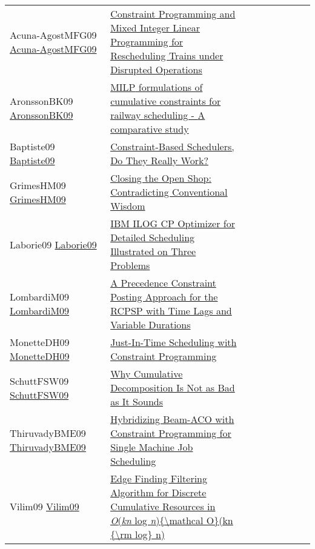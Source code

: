 {\begin{longtable}{p{3cm}p{7cm}lllllll}
Acuna-AgostMFG09 \href{https://doi.org/10.1007/978-3-642-01929-6\_24}{Acuna-AgostMFG09} &  \href{papers/Acuna-AgostMFG09.pdf}{Constraint Programming and Mixed Integer Linear Programming for Rescheduling Trains under Disrupted Operations} &  &  &  &  &  &  & \\
AronssonBK09 \href{http://drops.dagstuhl.de/opus/volltexte/2009/2141}{AronssonBK09} &  \href{papers/AronssonBK09.pdf}{{MILP} formulations of cumulative constraints for railway scheduling - {A} comparative study} &  &  &  &  &  &  & \\
Baptiste09 \href{https://doi.org/10.1007/978-3-642-04244-7\_1}{Baptiste09} &  \href{papers/Baptiste09.pdf}{Constraint-Based Schedulers, Do They Really Work?} &  &  &  &  &  &  & \\
GrimesHM09 \href{https://doi.org/10.1007/978-3-642-04244-7\_33}{GrimesHM09} &  \href{papers/GrimesHM09.pdf}{Closing the Open Shop: Contradicting Conventional Wisdom} &  &  &  &  &  &  & \\
Laborie09 \href{https://doi.org/10.1007/978-3-642-01929-6\_12}{Laborie09} &  \href{papers/Laborie09.pdf}{{IBM} {ILOG} {CP} Optimizer for Detailed Scheduling Illustrated on Three Problems} &  &  &  &  &  &  & \\
LombardiM09 \href{https://doi.org/10.1007/978-3-642-04244-7\_45}{LombardiM09} &  \href{papers/LombardiM09.pdf}{A Precedence Constraint Posting Approach for the {RCPSP} with Time Lags and Variable Durations} &  &  &  &  &  &  & \\
MonetteDH09 \href{http://aaai.org/ocs/index.php/ICAPS/ICAPS09/paper/view/712}{MonetteDH09} &  \href{papers/MonetteDH09.pdf}{Just-In-Time Scheduling with Constraint Programming} &  &  &  &  &  &  & \\
SchuttFSW09 \href{https://doi.org/10.1007/978-3-642-04244-7\_58}{SchuttFSW09} &  \href{papers/SchuttFSW09.pdf}{Why Cumulative Decomposition Is Not as Bad as It Sounds} &  &  &  &  &  &  & \\
ThiruvadyBME09 \href{https://doi.org/10.1007/978-3-642-04918-7\_3}{ThiruvadyBME09} &  \href{papers/ThiruvadyBME09.pdf}{Hybridizing Beam-ACO with Constraint Programming for Single Machine Job Scheduling} &  &  &  &  &  &  & \\
Vilim09 \href{https://doi.org/10.1007/978-3-642-04244-7\_62}{Vilim09} &  \href{papers/Vilim09.pdf}{Edge Finding Filtering Algorithm for Discrete Cumulative Resources in \emph{O}(\emph{kn} log \emph{n})\{{\textbackslash}mathcal O\}(kn \{{\textbackslash}rm log\} n)} &  &  &  &  &  &  & \\

\end{longtable}}
